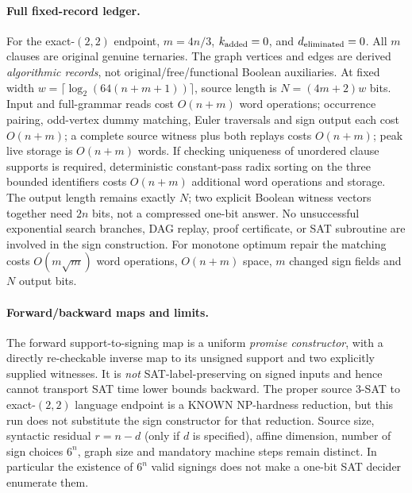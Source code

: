 \documentclass[11pt]{article}
\begin{document}
\paragraph{Full fixed-record ledger.}
For the exact-$(2,2)$ endpoint, \(m=4n/3\), \(k_{\rm added}=0\), and \(d_{\rm eliminated}=0\). All \(m\) clauses are original genuine ternaries. The graph vertices and edges are derived \emph{algorithmic records}, not original/free/functional Boolean auxiliaries. At fixed width \(w=\lceil\log_2(64(n+m+1))\rceil\), source length is \(N=(4m+2)w\) bits. Input and full-grammar reads cost \(O(n+m)\) word operations; occurrence pairing, odd-vertex dummy matching, Euler traversals and sign output each cost \(O(n+m)\); a complete source witness plus both replays costs \(O(n+m)\); peak live storage is \(O(n+m)\) words. If checking uniqueness of unordered clause supports is required, deterministic constant-pass radix sorting on the three bounded identifiers costs \(O(n+m)\) additional word operations and storage. The output length remains exactly \(N\); two explicit Boolean witness vectors together need \(2n\) bits, not a compressed one-bit answer. No unsuccessful exponential search branches, DAG replay, proof certificate, or SAT subroutine are involved in the sign construction. For monotone optimum repair the matching costs \(O(m\sqrt m)\) word operations, \(O(n+m)\) space, \(m\) changed sign fields and \(N\) output bits.

\paragraph{Forward/backward maps and limits.}
The forward support-to-signing map is a uniform \emph{promise constructor}, with a directly re-checkable inverse map to its unsigned support and two explicitly supplied witnesses. It is \emph{not} SAT-label-preserving on signed inputs and hence cannot transport SAT time lower bounds backward. The proper source 3-SAT to exact-$(2,2)$ language endpoint is a KNOWN NP-hardness reduction, but this run does not substitute the sign constructor for that reduction. Source size, syntactic residual \(r=n-d\) (only if \(d\) is specified), affine dimension, number of sign choices \(6^n\), graph size and mandatory machine steps remain distinct. In particular the existence of \(6^n\) valid signings does not make a one-bit SAT decider enumerate them.
\end{document}
